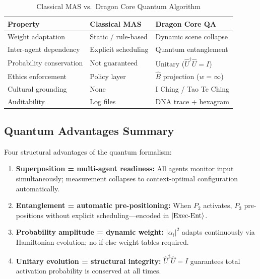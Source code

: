 \documentclass[conference]{IEEEtran}
\begin{document}
\begin{table}[!ht]
\caption{Classical MAS vs.\ Dragon Core Quantum Algorithm}
\label{tab:comparison}
\centering
\renewcommand{\arraystretch}{1.15}
\begin{tabular}{p{2.0cm}p{2.5cm}p{2.5cm}}
\toprule
\textbf{Property}
  & \textbf{Classical MAS}
  & \textbf{Dragon Core QA} \\
\midrule
Weight adaptation
  & Static / rule-based
  & Dynamic scene collapse \\
Inter-agent dependency
  & Explicit scheduling
  & Quantum entanglement \\
Probability conservation
  & Not guaranteed
  & Unitary ($\hat{U}^\dagger\hat{U}=I$) \\
Ethics enforcement
  & Policy layer
  & $\hat{B}$ projection ($w=\infty$) \\
Cultural grounding
  & None
  & I Ching / Tao Te Ching \\
Auditability
  & Log files
  & DNA trace + hexagram \\
\bottomrule
\end{tabular}
\end{table}

\subsection{Quantum Advantages Summary}

Four structural advantages of the quantum formalism:

\begin{enumerate}
  \item \textbf{Superposition = multi-agent readiness:}
        All agents monitor input simultaneously;
        measurement collapses to context-optimal
        configuration automatically.

  \item \textbf{Entanglement = automatic pre-positioning:}
        When $P_2$ activates, $P_3$ pre-positions without
        explicit scheduling---encoded in $\ket{\text{Exec-Ent}}$.

  \item \textbf{Probability amplitude = dynamic weight:}
        $|\alpha_i|^2$ adapts continuously via Hamiltonian
        evolution; no if-else weight tables required.

  \item \textbf{Unitary evolution = structural integrity:}
        $\hat{U}^\dagger\hat{U} = I$ guarantees total
        activation probability is conserved at all times.
\end{enumerate}
\end{document}
